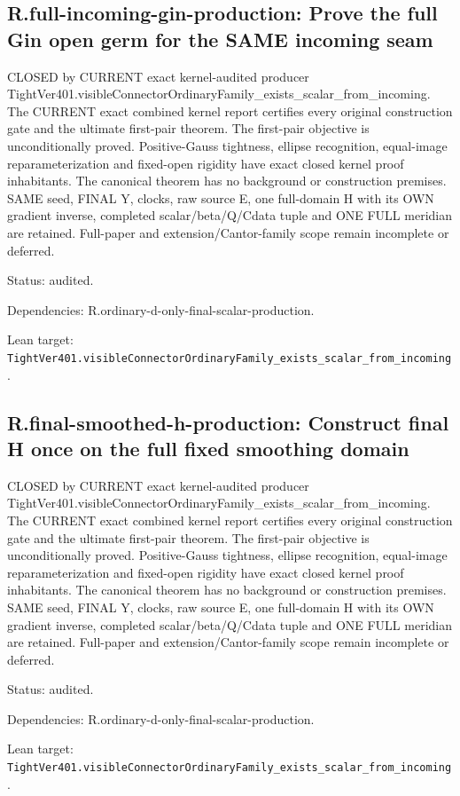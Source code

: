 \documentclass{article}
\begin{document}
\subsection*{R.full-incoming-gin-production: Prove the full Gin open germ for the SAME incoming seam}
CLOSED by CURRENT exact kernel-audited producer TightVer401.visibleConnectorOrdinaryFamily\_exists\_scalar\_from\_incoming. The CURRENT exact combined kernel report certifies every original construction gate and the ultimate first-pair theorem. The first-pair objective is unconditionally proved. Positive-Gauss tightness, ellipse recognition, equal-image reparameterization and fixed-open rigidity have exact closed kernel proof inhabitants. The canonical theorem has no background or construction premises. SAME seed, FINAL Y, clocks, raw source E, one full-domain H with its OWN gradient inverse, completed scalar/beta/Q/Cdata tuple and ONE FULL meridian are retained. Full-paper and extension/Cantor-family scope remain incomplete or deferred.
\par Status: audited.
\par Dependencies: R.ordinary-d-only-final-scalar-production.
\par Lean target: \texttt{TightVer401.visibleConnectorOrdinaryFamily\_exists\_scalar\_from\_incoming}.
\subsection*{R.final-smoothed-h-production: Construct final H once on the full fixed smoothing domain}
CLOSED by CURRENT exact kernel-audited producer TightVer401.visibleConnectorOrdinaryFamily\_exists\_scalar\_from\_incoming. The CURRENT exact combined kernel report certifies every original construction gate and the ultimate first-pair theorem. The first-pair objective is unconditionally proved. Positive-Gauss tightness, ellipse recognition, equal-image reparameterization and fixed-open rigidity have exact closed kernel proof inhabitants. The canonical theorem has no background or construction premises. SAME seed, FINAL Y, clocks, raw source E, one full-domain H with its OWN gradient inverse, completed scalar/beta/Q/Cdata tuple and ONE FULL meridian are retained. Full-paper and extension/Cantor-family scope remain incomplete or deferred.
\par Status: audited.
\par Dependencies: R.ordinary-d-only-final-scalar-production.
\par Lean target: \texttt{TightVer401.visibleConnectorOrdinaryFamily\_exists\_scalar\_from\_incoming}.
\end{document}
